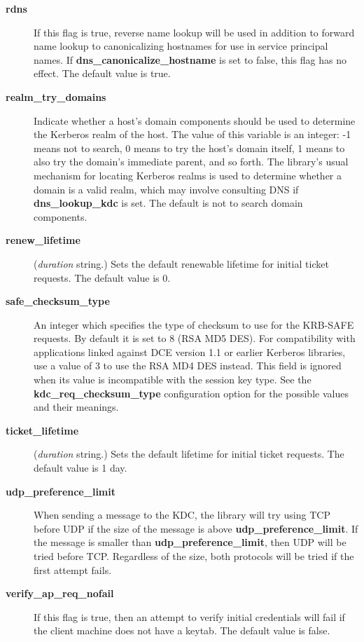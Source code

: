 \documentclass[letterpaper,10pt,english]{sphinxmanual}
\begin{document}
\begin{description}
\item[{\textbf{rdns}}] \leavevmode
If this flag is true, reverse name lookup will be used in addition
to forward name lookup to canonicalizing hostnames for use in
service principal names.  If \textbf{dns\_canonicalize\_hostname} is set
to false, this flag has no effect.  The default value is true.

\item[{\textbf{realm\_try\_domains}}] \leavevmode
Indicate whether a host's domain components should be used to
determine the Kerberos realm of the host.  The value of this
variable is an integer: -1 means not to search, 0 means to try the
host's domain itself, 1 means to also try the domain's immediate
parent, and so forth.  The library's usual mechanism for locating
Kerberos realms is used to determine whether a domain is a valid
realm, which may involve consulting DNS if \textbf{dns\_lookup\_kdc} is
set.  The default is not to search domain components.

\item[{\textbf{renew\_lifetime}}] \leavevmode
(\emph{duration} string.)  Sets the default renewable lifetime
for initial ticket requests.  The default value is 0.

\item[{\textbf{safe\_checksum\_type}}] \leavevmode
An integer which specifies the type of checksum to use for the
KRB-SAFE requests.  By default it is set to 8 (RSA MD5 DES).  For
compatibility with applications linked against DCE version 1.1 or
earlier Kerberos libraries, use a value of 3 to use the RSA MD4
DES instead.  This field is ignored when its value is incompatible
with the session key type.  See the \textbf{kdc\_req\_checksum\_type}
configuration option for the possible values and their meanings.

\item[{\textbf{ticket\_lifetime}}] \leavevmode
(\emph{duration} string.)  Sets the default lifetime for initial
ticket requests.  The default value is 1 day.

\item[{\textbf{udp\_preference\_limit}}] \leavevmode
When sending a message to the KDC, the library will try using TCP
before UDP if the size of the message is above
\textbf{udp\_preference\_limit}.  If the message is smaller than
\textbf{udp\_preference\_limit}, then UDP will be tried before TCP.
Regardless of the size, both protocols will be tried if the first
attempt fails.

\item[{\textbf{verify\_ap\_req\_nofail}}] \leavevmode
If this flag is true, then an attempt to verify initial
credentials will fail if the client machine does not have a
keytab.  The default value is false.

\end{description}
\end{document}
